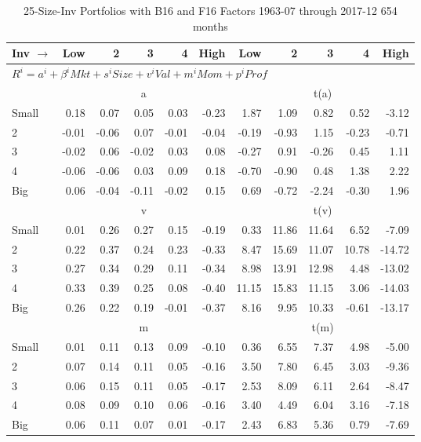 
\begin{table}[!ht]
\footnotesize
\centering
\caption{25-Size-Inv Portfolios with B16 and F16 Factors 1963-07 through
2017-12 654 months}
\begin{tabular}{lrrrrrrrrrr}
  \toprule
    
    Inv $\rightarrow$ & Low & 2 & 3 & 4 & High & Low & 2 & 3 & 4 & High  \\ 
  \midrule
  \multicolumn{11}{l}{$R^i=a^i+\beta^iMkt+s^iSize+v^iVal+m^iMom+p^iProf$}  \\
  
     & \multicolumn{5}{c}{a} & \multicolumn{5}{c}{t(a)}   \\
     \cmidrule(r){2-6} \cmidrule(r){7-11} 
    Small  & 0.18  & 0.07  & 0.05  & 0.03  & -0.23  & 1.87  & 1.09  & 0.82  & 0.52  & -3.12   \\
    2  & -0.01  & -0.06  & 0.07  & -0.01  & -0.04  & -0.19  & -0.93  & 1.15  & -0.23  & -0.71   \\
    3  & -0.02  & 0.06  & -0.02  & 0.03  & 0.08  & -0.27  & 0.91  & -0.26  & 0.45  & 1.11   \\
    4  & -0.06  & -0.06  & 0.03  & 0.09  & 0.18  & -0.70  & -0.90  & 0.48  & 1.38  & 2.22   \\
    Big  & 0.06  & -0.04  & -0.11  & -0.02  & 0.15  & 0.69  & -0.72  & -2.24  & -0.30  & 1.96   \\
  
     & \multicolumn{5}{c}{v} & \multicolumn{5}{c}{t(v)}   \\
     \cmidrule(r){2-6} \cmidrule(r){7-11} 
    Small  & 0.01  & 0.26  & 0.27  & 0.15  & -0.19  & 0.33  & 11.86  & 11.64  & 6.52  & -7.09   \\
    2  & 0.22  & 0.37  & 0.24  & 0.23  & -0.33  & 8.47  & 15.69  & 11.07  & 10.78  & -14.72   \\
    3  & 0.27  & 0.34  & 0.29  & 0.11  & -0.34  & 8.98  & 13.91  & 12.98  & 4.48  & -13.02   \\
    4  & 0.33  & 0.39  & 0.25  & 0.08  & -0.40  & 11.15  & 15.83  & 11.15  & 3.06  & -14.03   \\
    Big  & 0.26  & 0.22  & 0.19  & -0.01  & -0.37  & 8.16  & 9.95  & 10.33  & -0.61  & -13.17   \\
    
  
     & \multicolumn{5}{c}{m} & \multicolumn{5}{c}{t(m)}   \\
     \cmidrule(r){2-6} \cmidrule(r){7-11} 
    Small  & 0.01  & 0.11  & 0.13  & 0.09  & -0.10  & 0.36  & 6.55  & 7.37  & 4.98  & -5.00   \\
    2  & 0.07  & 0.14  & 0.11  & 0.05  & -0.16  & 3.50  & 7.80  & 6.45  & 3.03  & -9.36   \\
    3  & 0.06  & 0.15  & 0.11  & 0.05  & -0.17  & 2.53  & 8.09  & 6.11  & 2.64  & -8.47   \\
    4  & 0.08  & 0.09  & 0.10  & 0.06  & -0.16  & 3.40  & 4.49  & 6.04  & 3.16  & -7.18   \\
    Big  & 0.06  & 0.11  & 0.07  & 0.01  & -0.17  & 2.43  & 6.83  & 5.36  & 0.79  & -7.69   \\
    

\end{tabular}
\end{table}
